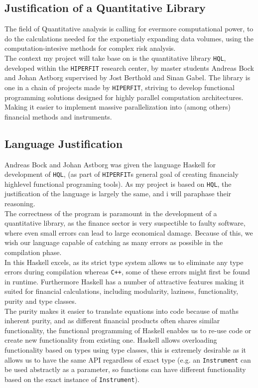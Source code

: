 \documentclass{article}
\newcommand{\HF}{\texttt{HIPERFIT}}
\newcommand{\HQL}{\texttt{HQL}}
\newcommand{\Cpp}{\texttt{C++}}
\theoremstyle{definition}
\begin{document}
\subsection{Justification of a Quantitative Library}
The field of Quantitative analysis is calling for evermore computational power, to
do the calculations needed for the exponetialy expanding data volumes, using the 
computation-intesive methods for complex risk analysis.\\
The context my project will take base on is the quantitative library \HQL\cite{HQL},
developed within the \HF\cite{HF} research center, by master students Andreas Bock 
and Johan Astborg supervised by Jost Berthold and Sinan Gabel. 
The library is one in a chain of projects made by \HF, striving to develop 
functional programming solutions designed for highly parallel computation architectures.
Making it easier to implement massive parallelization into (among others) financial 
methods and instruments\cite{FHPH}.

\subsection{Language Justification}
Andreas Bock and Johan Astborg was given the language Haskell for development of \HQL\cite{HQL},
(as part of \HF s general goal of creating financialy highlevel functional programing tools\cite{HF}). 
As my project is based on \HQL, the justification of the language is largely the same, and i will paraphase their reasoning.\\
The correctness of the program is paramount in the development of a quantitative library, as 
the finance sector is very suspectible to faulty software, where even small errors
can lead to large economical damage. Because of this, we wish our language capable
of catching as many errors as possible in the compilation phase. \\
In this Haskell excels, as its strict type system allows us to eliminate any type errors during compilation
whereas \Cpp, some of these errors might first be found in runtime.
Furthermore Haskell has a number of attractive features making it suited
for financial calculations, including modularity\cite{WFM}, laziness\cite{Cc}, functionality, purity and type classes.\\
The purity makes it easier to translate equations into code because of maths inherent purity,
and as different financial products often shares similar functionality, the functional 
programming of Haskell enables us to re-use code or create new functionality from existing one.
Haskell allows overloading functionality based on types using type classes, this is extremely desirable
as it allows us to have the same API regardless of exact type (e.g. an \texttt{Instrument} can be used abstractly 
as a parameter, so functions can have different functionality based on the exact instance of \texttt{Instrument}).
\end{document}
